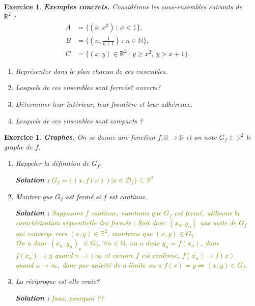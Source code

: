 \documentclass[11pt,a4paper]{article}
\newcommand{\N}{\mathbb{N}}
\newcommand{\R}{\mathbb{R}}
\newcommand{\vfe}{\vfill\eject}
\newcounter{ex}
\newtheorem{exs}[ex]{Exercice}
\newenvironment{exo}{\begin{exs}\rm}{\end{exs}\vspace{.1cm}}
\newcommand{\solution}[1]{\par\noindent\textbf{\color{olive}Solution :} \textcolor{olive}{#1}}
\begin{document}
\begin{exo}\textbf{Exemples concrets.} Considérons les sous-ensembles suivants de $\R^2$ :
\begin{align*}
A&=\{(x,x^3)\,:\,x< 1\},\\
B&=\{(n,\frac{1}{n+1})\,:\,n\in\N\},\\
C&=\{(x,y)\in\R^2\,:\,y\ge x^2,\ y>x+1\}.
\end{align*}
\begin{enumerate}
    \item Représenter dans le plan chacun de ces ensembles.
    \item Lesquels de ces ensembles sont ferm\'es? ouverts?
    \item Déterminer leur intérieur, leur frontière et leur adhérence. 
    \item Lesquels de ces ensembles sont compacts ?
\end{enumerate}  
\end{exo}

\vfe 

\begin{exo}\textbf{Graphes.} On se donne une fonction $f : \R \to \R$
et on note $G_f \subset \R^2$ le graphe de $f$. 
\begin{enumerate}
    \item Rappeler la d\'efinition de $G_f$.
	    \solution{$G_f = \{(x,f(x)) | x \in \mathcal{D}_f\} \subset \R^2$}
    \item Montrer que $G_f$ est ferm\'e si $f$ est continue. 
	    \solution{Supposons $f$ continue, montrons que $G_f$ est fermé, utilisons la caractérisation séquentielle des fermés : Soit donc $(x_n,y_n)$ une suite de $G_f$ qui converge vers $(x,y)\in \R^2$, montrons que $(x,y)\in G_f$.\\
		On a donc $(x_n,y_n)_n \in G_f,~ \forall n \in \N$, on a donc $y_n = f(x_n)$, donc $f(x_n) \to y$ quand $n \to + \infty$ et comme $f$ est continue, $f(x_n) \to f(x)$ quand $n \to \infty$, donc par unicité de a limite on a $f(x) = y \Rightarrow (x,y) \in G_f$.
		}
    \item La r\'eciproque est-elle vraie?
	    \solution{faux, pourquoi ??}
\end{enumerate}  
\end{exo}
\end{document}
